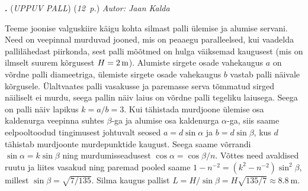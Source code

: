 \documentclass[11pt,a5paper]{article}
\newcommand{\numb}[1]{\vspace{5pt}\textbf{\large #1}}
\newcommand{\nimi}[1]{(\textsl{\small \uppercase{#1}})}
\newcommand{\punktid}[1]{(\emph{#1~p.})}
\newcounter{ylesanne}
\newcommand{\yl}[1]{\addtocounter{ylesanne}{1}\numb{\theylesanne.} \nimi{#1} \newblock{}}
\newcommand{\autor}[1]{\emph{Autor: #1}}%
\begin{document}
\yl{Uppuv pall}
\punktid{12} \autor{Jaan Kalda}\par
Teeme joonise valguskiire käigu kohta silmast palli ülemise ja alumise servani. Need on veepinnal murduvad jooned, mis on peaaegu paralleelsed, kui vaadelda pallilähedast piirkonda, sest palli mõõtmed on hulga väiksemad kaugusest (mis on ilmselt suurem kõrgusest $H=\SI 2\m$). Alumiste sirgete osade vahekaugus $a$ on võrdne palli diameetriga, ülemiste sirgete osade vahekaugus $b$ vastab palli näivale kõrgusele. Ülaltvaates palli vasakusse ja paremasse serva tõmmatud sirged näiliselt ei murdu, seega pallin näiv laius on võrdne palli tegeliku laiusega. Seega on palli näiv lapikus $k=a/b=3$. Kui tähistada murdjoone ülemise osa kaldenurga veepinna suhtes $\beta$-ga ja alumise osa kaldenurga $\alpha$-ga, siis saame eelpooltoodud tingimusest johtuvalt seosed $a=d\sin\alpha$ ja $b=d\sin\beta$, kus $d$ tähistab murdjoonte murdepunktide kaugust. Seega saame võrrandi $\sin\alpha=k\sin\beta$ ning murdumisseadusest  $\cos\alpha=\cos\beta/n$. Võttes need avaldised ruutu ja liites vasakud ning paremad pooled saame $1-n^{-2}=(k^2-n^{-2})\sin^2\beta$, millest $\sin\beta=\sqrt{7/135}$. Silma kaugus pallist $L=H/\sin\beta=H\sqrt{135/7}\approx\SI{8.8}\m$.
\end{document}
